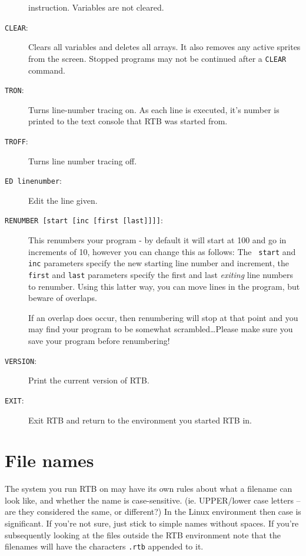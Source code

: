 \begin{description}
instruction. Variables are not cleared.
\item[{\tt CLEAR}:]
Clears all variables and deletes all arrays. It also removes any active
sprites from the screen.  Stopped programs may not be continued after
a {\tt CLEAR} command.
\item[{\tt TRON}:]
Turns line-number tracing on. As each line is executed, it's number is
printed to the text console that RTB was started from.
\item[{\tt TROFF}:]
Turns line number tracing off.
\item[{\tt ED linenumber}:]
Edit the line given.
\item[{\tt RENUMBER [start [inc [first [last]]]]}:]
This renumbers your program - by default it will start at 100 and go
in increments of 10, however you can change this as follows: The {\tt
start} and {\tt inc} parameters specify the new starting line number and
increment, the {\tt first} and {\tt last} parameters specify the first
and last {\em exiting} line numbers to renumber. Using this latter way,
you can move lines in the program, but beware of overlaps.

If an overlap does occur, then renumbering will stop at that point and
you may find your program to be somewhat scrambled\dots Please make sure
you save your program before renumbering!

\item[{\tt VERSION}:]
Print the current version of RTB.
\item[{\tt EXIT}:]
Exit RTB and return to the environment you started RTB in.
\end{description}

\section{File names}
The system you run RTB on may have its own rules
about what a filename can look like, and whether the name is
case-sensitive. (ie. UPPER/lower case letters -- are they considered the
same, or different?) In the Linux environment then case is significant. If
you're not sure, just stick to simple names without spaces. If you're
subsequently looking at the files outside the RTB environment note that
the filenames will have the characters {\tt .rtb} appended to it.

